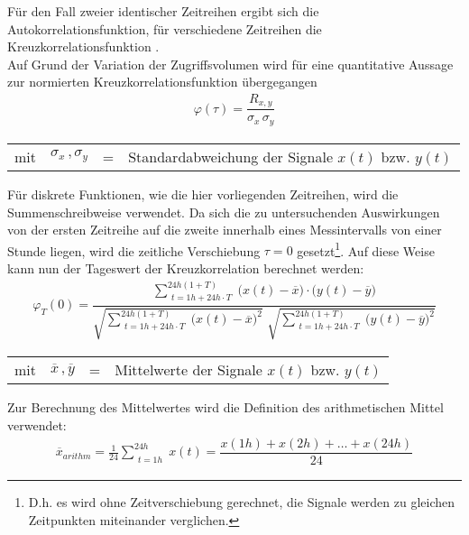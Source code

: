 \documentclass[a4paper,10pt]{scrbook}
\begin{document}
Für den Fall zweier identischer Zeitreihen ergibt sich die Autokorrelationsfunktion, für verschiedene Zeitreihen die Kreuzkorrelationsfunktion \cite{Ultraschall}. \\
Auf Grund der Variation der Zugriffsvolumen wird für eine quantitative Aussage zur normierten Kreuzkorrelationsfunktion \cite{Ultraschall} übergegangen
\begin{align}
\varphi(\tau) = \dfrac{R_{x,y}}{\sigma_{x}\,\sigma_{y}}
\label{KK}
\end{align}
\begin{table}[H]
\begin{tabular}{rccl}
mit  & $\sigma_{x} \, , \sigma_{y}$ & = & Standardabweichung der Signale $x(t)$ bzw. $y(t)$\\
\end{tabular}
\end{table}
Für diskrete Funktionen, wie die hier vorliegenden Zeitreihen, wird die Summenschreibweise verwendet. Da sich die zu untersuchenden Auswirkungen von der ersten Zeitreihe auf die zweite innerhalb eines Messintervalls von einer Stunde liegen, wird die zeitliche Verschiebung $\tau = 0$ gesetzt\footnote{D.h. es wird ohne Zeitverschiebung gerechnet, die Signale werden zu gleichen Zeitpunkten miteinander verglichen.}. Auf diese Weise kann nun der Tageswert der Kreuzkorrelation berechnet werden:
\begin{align}
\varphi_{T} (0) = \dfrac{\sum_{\substack{t=1h+24h\cdot T}}^{24h(1+T)} \bigl( x(t) - \overline{x} \bigr) \cdot \bigl( y(t) - \overline{y} \bigr)}{\sqrt{\sum_{\substack{t=1h+24h\cdot T}}^{24h(1+T)} \bigl( x(t) - \overline{x} \bigr)^{2}} \,\, \sqrt{\sum_{\substack{t=1h+24h\cdot T}}^{24h(1+T)} \bigl( y(t) - \overline{y} \bigr)^{2}}}
\label{KreuzKorrelation}
\end{align}

\begin{table}[H]
\begin{tabular}{rccl}
mit  & $\overline{x} \, , \overline{y}$ & = & Mittelwerte der Signale $x(t)$ bzw. $y(t)$\\
\end{tabular}
\end{table}
Zur Berechnung des Mittelwertes wird die Definition des arithmetischen Mittel \cite{TaschenbuchMathematik} verwendet:
\begin{align}
\overline{x}_{arithm} = \frac{1}{24} \sum_{\substack{t=1h}}^{24h} x(t) = \dfrac{x(1h)+x(2h)+ \ldots +x(24h)}{24}
\label{Mittelwert}
\end{align}
\end{document}
